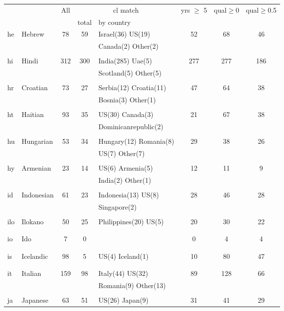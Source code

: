 \begin{figure}[h]
\centering
\begin{tabular}{llcclccc}
&&All&\multicolumn{2}{c}{cl match}&yrs $\geq$ 5&qual$\geq$0&qual$\geq$0.5\\
&&&total&by country&&\\
\hline\hline
he&Hebrew&78&59&Israel(36) US(19) &52&68&46\\
&&&&Canada(2) Other(2) &&&\\
&&&&&&&\\
hi&Hindi&312&300&India(285) Uae(5) &277&277&186\\
&&&&Scotland(5) Other(5) &&&\\
&&&&&&&\\
hr&Croatian&73&27&Serbia(12) Croatia(11) &47&64&38\\
&&&&Bosnia(3) Other(1) &&&\\
&&&&&&&\\
ht&Haitian&93&35&US(30) Canada(3) &21&67&38\\
&&&&Dominicanrepublic(2) &&&\\
&&&&&&&\\
hu&Hungarian&53&34&Hungary(12) Romania(8) &29&38&26\\
&&&&US(7) Other(7) &&&\\
&&&&&&&\\
hy&Armenian&23&14&US(6) Armenia(5) &12&11&9\\
&&&&India(2) Other(1) &&&\\
&&&&&&&\\
id&Indonesian&61&23&Indonesia(13) US(8) &28&46&28\\
&&&&Singapore(2) &&&\\
&&&&&&&\\
ilo&Ilokano&50&25&Philippines(20) US(5) &20&30&22\\
&&&&&&&\\
&&&&&&&\\
io&Ido&7&0&&0&4&4\\
&&&&&&&\\
&&&&&&&\\
is&Icelandic&98&5&US(4) Iceland(1) &10&80&47\\
&&&&&&&\\
&&&&&&&\\
it&Italian&159&98&Italy(44) US(32) &89&128&66\\
&&&&Romania(9) Other(13) &&&\\
&&&&&&&\\
ja&Japanese&63&51&US(26) Japan(9) &31&41&29\\

\end{tabular}
\end{figure}
